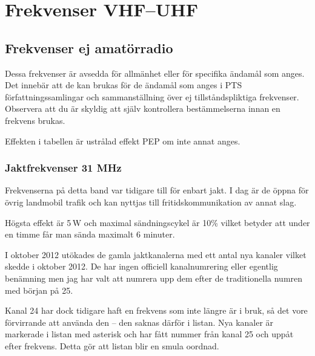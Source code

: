 \section{Frekvenser VHF--UHF}

\subsection{Frekvenser ej amatörradio}

Dessa frekvenser är avsedda för allmänhet eller för specifika
ända\-mål som anges. Det innebär att de kan brukas för de ändamål som
anges i PTS för\-fatt\-nings\-sam\-ling\-ar och sammanställning över
ej tillståndspliktiga frekvenser. Observera att du är skyldig att
själv kontrollera bestämmelserna innan en frekvens brukas.

Effekten i tabellen är ustrålad effekt PEP om inte annat anges.

\subsubsection{Jaktfrekvenser 31 MHz}

Frekvenserna på detta band var tidigare till för enbart jakt. I dag är
de öppna för övrig landmobil trafik och kan nyttjas till
fritidskommunikation av annat slag.

Högsta effekt är 5\,W och maximal sändningscykel är 10\% vilket
betyder att under en timme får man sända maximalt 6 minuter.

I oktober 2012 utökades de gamla jaktkanalerna med ett antal nya
kanaler vilket skedde i oktober 2012. De har ingen officiell
kanalnumrering eller egentlig benämning men jag har valt att numrera
upp dem efter de traditionella numren med början på 25.

Kanal 24 har dock tidigare haft en frekvens som inte längre är i bruk,
så det vore förvirrande att använda den -- den saknas därför i listan.
Nya kanaler är markerade i listan med asterisk och har fått nummer
från kanal 25 och uppåt efter frekvens. Detta gör att listan blir en
smula oordnad.

